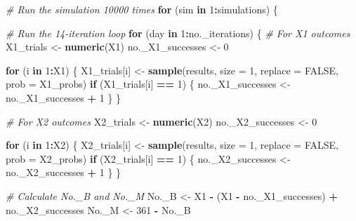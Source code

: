 \documentclass[
]{article}
\newenvironment{Shaded}{\begin{snugshade}}{\end{snugshade}}
\newcommand{\AttributeTok}[1]{\textcolor[rgb]{0.13,0.29,0.53}{#1}}
\newcommand{\CommentTok}[1]{\textcolor[rgb]{0.56,0.35,0.01}{\textit{#1}}}
\newcommand{\ConstantTok}[1]{\textcolor[rgb]{0.56,0.35,0.01}{#1}}
\newcommand{\ControlFlowTok}[1]{\textcolor[rgb]{0.13,0.29,0.53}{\textbf{#1}}}
\newcommand{\DecValTok}[1]{\textcolor[rgb]{0.00,0.00,0.81}{#1}}
\newcommand{\FunctionTok}[1]{\textcolor[rgb]{0.13,0.29,0.53}{\textbf{#1}}}
\newcommand{\NormalTok}[1]{#1}
\newcommand{\OtherTok}[1]{\textcolor[rgb]{0.56,0.35,0.01}{#1}}
\newcommand{\SpecialCharTok}[1]{\textcolor[rgb]{0.81,0.36,0.00}{\textbf{#1}}}
\begin{document}
\begin{Shaded}
\begin{Highlighting}[]
\CommentTok{\# Run the simulation 10000 times}
\ControlFlowTok{for}\NormalTok{ (sim }\ControlFlowTok{in} \DecValTok{1}\SpecialCharTok{:}\NormalTok{simulations) \{}
  
  \CommentTok{\# Run the 14{-}iteration loop}
  \ControlFlowTok{for}\NormalTok{ (day }\ControlFlowTok{in} \DecValTok{1}\SpecialCharTok{:}\NormalTok{no.\_iterations) \{}
    \CommentTok{\# For X1 outcomes}
\NormalTok{    X1\_trials }\OtherTok{\textless{}{-}} \FunctionTok{numeric}\NormalTok{(X1)}
\NormalTok{    no.\_X1\_successes }\OtherTok{\textless{}{-}} \DecValTok{0}
    
    \ControlFlowTok{for}\NormalTok{ (i }\ControlFlowTok{in} \DecValTok{1}\SpecialCharTok{:}\NormalTok{X1) \{}
\NormalTok{      X1\_trials[i] }\OtherTok{\textless{}{-}} \FunctionTok{sample}\NormalTok{(results, }\AttributeTok{size =} \DecValTok{1}\NormalTok{, }\AttributeTok{replace =} \ConstantTok{FALSE}\NormalTok{, }\AttributeTok{prob =}\NormalTok{ X1\_probs)}
      \ControlFlowTok{if}\NormalTok{ (X1\_trials[i] }\SpecialCharTok{==} \DecValTok{1}\NormalTok{) \{}
\NormalTok{        no.\_X1\_successes }\OtherTok{\textless{}{-}}\NormalTok{ no.\_X1\_successes }\SpecialCharTok{+} \DecValTok{1}
\NormalTok{      \}}
\NormalTok{    \}}
    
    \CommentTok{\# For X2 outcomes}
\NormalTok{    X2\_trials }\OtherTok{\textless{}{-}} \FunctionTok{numeric}\NormalTok{(X2)}
\NormalTok{    no.\_X2\_successes }\OtherTok{\textless{}{-}} \DecValTok{0}
    
    \ControlFlowTok{for}\NormalTok{ (i }\ControlFlowTok{in} \DecValTok{1}\SpecialCharTok{:}\NormalTok{X2) \{}
\NormalTok{      X2\_trials[i] }\OtherTok{\textless{}{-}} \FunctionTok{sample}\NormalTok{(results, }\AttributeTok{size =} \DecValTok{1}\NormalTok{, }\AttributeTok{replace =} \ConstantTok{FALSE}\NormalTok{, }\AttributeTok{prob =}\NormalTok{ X2\_probs)}
      \ControlFlowTok{if}\NormalTok{ (X2\_trials[i] }\SpecialCharTok{==} \DecValTok{1}\NormalTok{) \{}
\NormalTok{        no.\_X2\_successes }\OtherTok{\textless{}{-}}\NormalTok{ no.\_X2\_successes }\SpecialCharTok{+} \DecValTok{1}
\NormalTok{      \}}
\NormalTok{    \}}
    
    \CommentTok{\# Calculate No.\_B and No.\_M}
\NormalTok{    No.\_B }\OtherTok{\textless{}{-}}\NormalTok{ X1 }\SpecialCharTok{{-}}\NormalTok{ (X1 }\SpecialCharTok{{-}}\NormalTok{ no.\_X1\_successes) }\SpecialCharTok{+}\NormalTok{ no.\_X2\_successes}
\NormalTok{    No.\_M }\OtherTok{\textless{}{-}} \DecValTok{361} \SpecialCharTok{{-}}\NormalTok{ No.\_B}
    

\end{Highlighting}
\end{Shaded}
\end{document}
